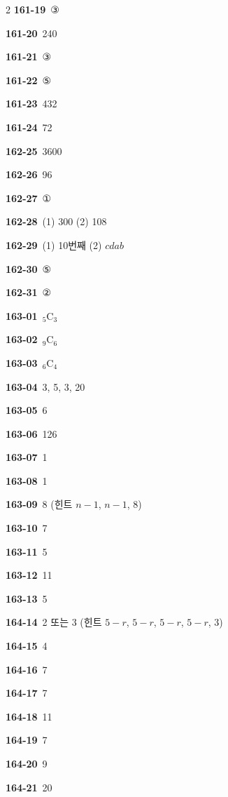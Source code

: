 \documentclass[10pt,a4paper]{article}
\begin{document}
\begin{multicols}{2}
\noindent\textbf{161-19}\ ③\par
\noindent\textbf{161-20}\ 240\par
\noindent\textbf{161-21}\ ③\par
\noindent\textbf{161-22}\ ⑤\par
\noindent\textbf{161-23}\ 432\par
\noindent\textbf{161-24}\ 72\par
\noindent\textbf{162-25}\ 3600\par
\noindent\textbf{162-26}\ 96\par
\noindent\textbf{162-27}\ ①\par
\noindent\textbf{162-28}\ (1) 300 (2) 108\par
\noindent\textbf{162-29}\ (1) 10번째 (2) $cdab$\par
\noindent\textbf{162-30}\ ⑤\par
\noindent\textbf{162-31}\ ②\par
\noindent\textbf{163-01}\ ${}_5\mathrm{C}_3$\par
\noindent\textbf{163-02}\ ${}_9\mathrm{C}_6$\par
\noindent\textbf{163-03}\ ${}_6\mathrm{C}_4$\par
\noindent\textbf{163-04}\ 3, 5, 3, 20\par
\noindent\textbf{163-05}\ 6\par
\noindent\textbf{163-06}\ 126\par
\noindent\textbf{163-07}\ 1\par
\noindent\textbf{163-08}\ 1\par
\noindent\textbf{163-09}\ 8 (힌트 $n-1$, $n-1$, $8$)\par
\noindent\textbf{163-10}\ 7\par
\noindent\textbf{163-11}\ 5\par
\noindent\textbf{163-12}\ 11\par
\noindent\textbf{163-13}\ 5\par
\noindent\textbf{164-14}\ 2 또는 3 (힌트 $5-r$, $5-r$, $5-r$, $5-r$, $3$)\par
\noindent\textbf{164-15}\ 4\par
\noindent\textbf{164-16}\ 7\par
\noindent\textbf{164-17}\ 7\par
\noindent\textbf{164-18}\ 11\par
\noindent\textbf{164-19}\ 7\par
\noindent\textbf{164-20}\ 9\par
\noindent\textbf{164-21}\ 20\par

\end{multicols}
\end{document}
